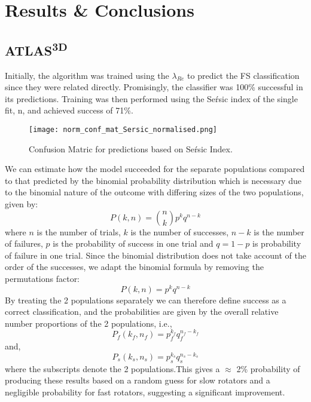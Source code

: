 \chapter{Results \& Conclusions}

\label{ch:results}

\section{ATLAS\textsuperscript{3D}}
Initially, the algorithm was trained using the $\lambda_{Re}$ to predict the FS classification since they were related directly. Promisingly, the classifier was 100\% successful in its predictions. Training was then performed using the Se\'rsic index of the single fit, n, and achieved success of 71\%.
\begin{figure}[h!]
	\centering
	\texttt{[image: norm\_conf\_mat\_Sersic\_normalised.png]}
	\caption{Confusion Matric for predictions based on Se\'rsic Index.
	}
	\label{fig:confmatDT}
\end{figure}
We can estimate how the model succeeded for the separate populations compared to that predicted by the binomial probability distribution which is necessary due to the binomial nature of the outcome with differing sizes of the two populations, given by\cite{simmons_2016}:
\begin{equation}
P(k,n) = \binom{n}{k}p^{k}q^{n-k}
\end{equation}
where $n$ is the number of trials, $k$ is the number of successes, $n-k$ is the number of failures, $p$ is the probability of success in one trial and $q=1-p$ is probability of failure in one trial. Since the binomial distribution does not take account of the order of the successes, we adapt the binomial formula by removing the permutations factor:
\begin{equation}
P(k,n) = p^{k}q^{n-k}
\end{equation}
By treating the 2 populations separately we can therefore define success as a correct classification, and the probabilities are given by the overall relative number proportions of the 2 populations, i.e.,
\begin{equation}
P_{f}(k_{f},n_{f}) = p_{f}^{k_{f}}q_{f}^{n_{f}-k_{f}}
\end{equation}
and,
\begin{equation}
P_{s}(k_{s},n_{s}) = p_{s}^{k_{s}}q_{s}^{n_{s}-k_{s}}
\end{equation}
where the subscripts denote the 2 populations.This gives a $\approx$ 2\% probability of producing these results based on a random guess for slow rotators and a negligible probability for fast rotators, suggesting a significant improvement. \\
